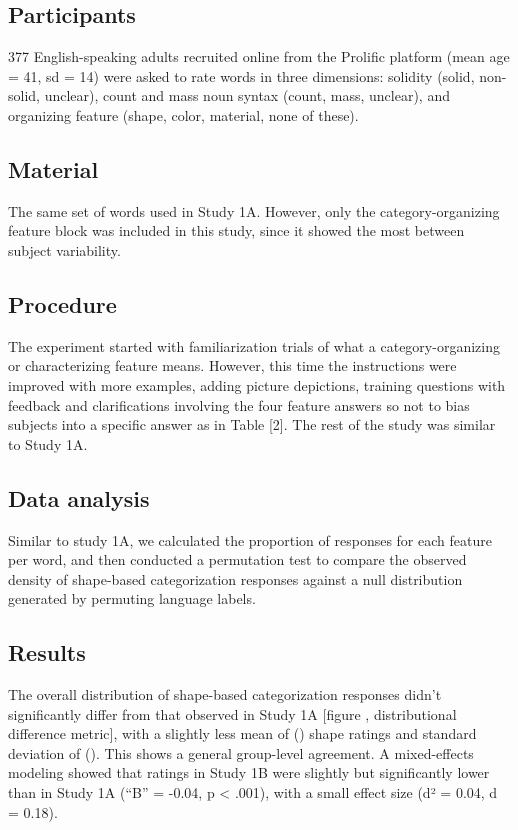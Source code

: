 \documentclass[
  english,
  man]{apa6}
\begin{document}
\subsection{Participants}\label{participants-1}

377 English-speaking adults recruited online from the Prolific platform (mean age = 41, sd = 14) were asked to rate words in three dimensions: solidity (solid, non-solid, unclear), count and mass noun syntax (count, mass, unclear), and organizing feature (shape, color, material, none of these).

\subsection{Material}\label{material-1}

The same set of words used in Study 1A. However, only the category-organizing feature block was included in this study, since it showed the most between subject variability.

\subsection{Procedure}\label{procedure-1}

The experiment started with familiarization trials of what a category-organizing or characterizing feature means. However, this time the instructions were improved with more examples, adding picture depictions, training questions with feedback and clarifications involving the four feature answers so not to bias subjects into a specific answer as in Table {[}2{]}. The rest of the study was similar to Study 1A.

\subsection{Data analysis}\label{data-analysis-1}

Similar to study 1A, we calculated the proportion of responses for each feature per word, and then conducted a permutation test to compare the observed density of shape-based categorization responses against a null distribution generated by permuting language labels.

\subsection{Results}\label{results-1}

The overall distribution of shape-based categorization responses didn't significantly differ from that observed in Study 1A {[}figure , distributional difference metric{]}, with a slightly less mean of () shape ratings and standard deviation of (). This shows a general group-level agreement. A mixed-effects modeling showed that ratings in Study 1B were slightly but significantly lower than in Study 1A (``B'' = -0.04, p \textless{} .001), with a small effect size (d² = 0.04, d = 0.18).
\end{document}
